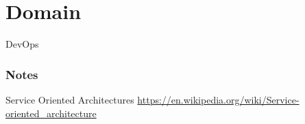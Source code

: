 \chapter{Domain}


DevOps






\subsection*{Notes}
Service Oriented Architectures \url{https://en.wikipedia.org/wiki/Service-oriented_architecture}





